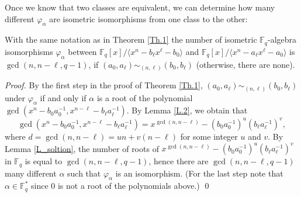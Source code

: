 \documentclass[12pt]{elsarticle}
\newcommand{\Fq}{\mathbb{F}_{q}}
\theoremstyle{break}
{\theorembodyfont{\upshape}
    \newtheorem{theorem}{Theorem}[section] %
    \newtheorem{lemma}[theorem]{Lemma} %
    \newtheorem{proposition}[theorem]{Proposition}
    \newtheorem{corollary}[theorem]{Corollary}
    \newtheorem{definition}[theorem]{Definition}
    \newtheorem{example}[theorem]{Example}
    \newtheorem{remark}[theorem]{Remark}
    \newtheorem{conjecture}[theorem]{Conjecture}
    \newtheorem*{proof}{{Proof}}
	\newtheorem*{notation}{Notation}
	\newtheorem*{main}{Cain Theorem}
	\newtheorem*{problem}{Problem}
}
\begin{document}




Once we know that two classes are equivalent, we can determine how many different $\varphi_\alpha$ are isometric isomorphisms from one class to the other:
\begin{corollary}
With the same notation as in Theorem \ref{Th.1} the number of isometric $\Fq$-algebra isomorphisms $\varphi_{\alpha}$ between $ \Fq[x]/\langle x^n-b_{\ell} x^{\ell}-b_0\rangle $ and $  \Fq[x]/\langle x^n-a_{\ell} x^{\ell}-a_0\rangle$ is $ \gcd(n, n-\ell, q-1) $, if $(a_0, a_{\ell}) \sim_{(n,\ell)} (b_0, b_{\ell})$ (otherwise, there are none).
\end{corollary}

\begin{proof}
By the first step in the proof of Theorem \ref{Th.1}, $ (a_0, a_{\ell}) \sim_{(n,\ell)} (b_0, b_{\ell}) $ under $\varphi_\alpha$ if and only if $\alpha$ is a root of the polynomial $ \gcd(x^{n} - b_0 a_0^{-1}, x^{n-\ell} - b_{\ell} a_{\ell}^{-1}) $. By Lemma \ref{L.2}, we obtain that
$$ \gcd(x^{n} - b_0 a_0^{-1}, x^{n-\ell} - b_{\ell} a_{\ell}^{-1}) = x^{\gcd(n,n-\ell)} -  (b_0 a_0^{-1})^u (b_{\ell} a_{\ell}^{-1})^v,$$ 
where $ d = \gcd(n, n-\ell)=un+v(n-\ell) $  for some integer $u$ and $v$.  By Lemma \ref{L_soltion}, the number of roots of $x^{\gcd(n,n-\ell)} - (b_0 a_0^{-1})^u (b_{\ell} a_{\ell}^{-1})^v$ in $ \Fq$ is equal to $ \gcd(n, n-\ell, q-1) $, hence there are  $ \gcd(n, n-\ell, q-1) $ many different $\alpha$ such that $\varphi_\alpha$ is an isomorphism. (For the last step note that $\alpha \in \Fq^*$ since $0$ is not a root of the polynomials above.)
\qed
\end{proof}
\end{document}
